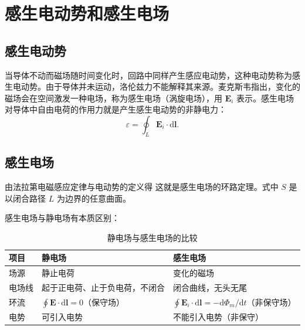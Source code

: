 
\section{感生电动势和感生电场}
    \subsection{感生电动势}
    当导体不动而磁场随时间变化时，回路中同样产生感应电动势，这种电动势称为感生电动势。由于导体并未运动，洛伦兹力不能解释其来源。麦克斯韦指出，变化的磁场会在空间激发一种电场，称为感生电场（涡旋电场），用 $\boldsymbol{E}_i$ 表示。感生电场对导体中自由电荷的作用力就是产生感生电动势的非静电力：
    \[
    \varepsilon=\oint_L\boldsymbol{E}_i\cdot\mathrm{d}\boldsymbol{l}.
    \]

    \subsection{感生电场}
    由法拉第电磁感应定律与电动势的定义得
    这就是感生电场的环路定理。式中 $S$ 是以闭合路径 $L$ 为边界的任意曲面。

    感生电场与静电场有本质区别：
    \begin{table}[htbp]
    \centering
    \caption{静电场与感生电场的比较}
    \begin{tabular}{lll}
    \toprule
    项目 & 静电场 & 感生电场 \\
    \midrule
    场源 & 静止电荷 & 变化的磁场 \\
    电场线 & 起于正电荷、止于负电荷，不闭合 & 闭合曲线，无头无尾 \\
    环流 & $\oint\boldsymbol{E}\cdot\mathrm{d}\boldsymbol{l}=0$（保守场） & $\oint\boldsymbol{E}_i\cdot\mathrm{d}\boldsymbol{l}=-\mathrm{d}\Phi_m/\mathrm{d}t$（非保守场） \\
    电势 & 可引入电势 & 不能引入电势（非保守） \\
    \bottomrule
    \end{tabular}
    \end{table}

